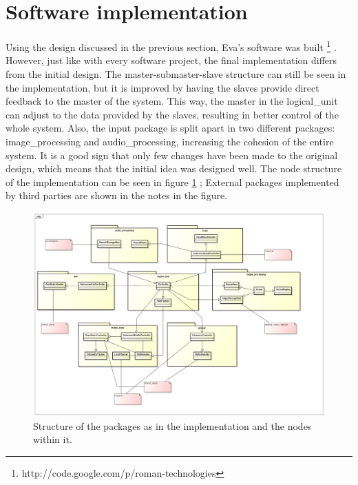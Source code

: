 \documentclass[technical_document.tex]{subfiles}
\begin{document}
\section{Software implementation}
\label{sec:implementation}
Using the design discussed in the previous section, Eva's software was built \footnote{http://code.google.com/p/roman-technologies} . However, just like with every software project, the final implementation differs from the initial design. The master-submaster-slave structure can still be seen in the implementation, but it is improved by having the slaves provide direct feedback to the master of the system. This way, the master in the logical\_unit can adjust to the data provided by the slaves, resulting in better control of the whole system. Also, the input package is split apart in two different packages: image\_processing and audio\_processing, increasing the cohesion of the entire system. It is a good sign that only few changes have been made to the original design, which means that the initial idea was designed well. The node structure of the implementation can be seen in figure \ref{fig:implementation} ; External packages implemented by third parties are shown in the notes in the figure.

\begin{figure}[ht!]
	\centering
	\mbox{\includegraphics[scale=0.3]{Images/nodes.png}}
	\caption{Structure of the packages as in the implementation and the nodes within it.}
	\label{fig:implementation}
\end{figure}
\end{document}
